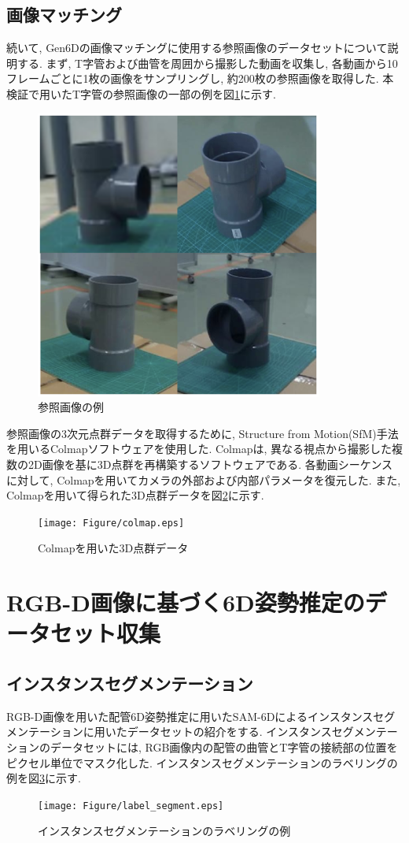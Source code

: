 \subsection{画像マッチング}
続いて, Gen6Dの画像マッチングに使用する参照画像のデータセットについて説明する. 
まず, T字管および曲管を周囲から撮影した動画を収集し, 各動画から10フレームごとに1枚の画像をサンプリングし, 約200枚の参照画像を取得した. 
本検証で用いたT字管の参照画像の一部の例を図\ref{fig:4-f2}に示す. 
\begin{figure}[htbt]
  \centering
   \includegraphics[height=95mm]{Figure/ref_images.eps}
   \caption{参照画像の例}
   \label{fig:4-f2}
\end{figure}

参照画像の3次元点群データを取得するために, Structure from Motion(SfM)手法を用いるColmapソフトウェアを使用した. 
Colmapは, 異なる視点から撮影した複数の2D画像を基に3D点群を再構築するソフトウェアである. 
各動画シーケンスに対して, Colmapを用いてカメラの外部および内部パラメータを復元した. 
また, Colmapを用いて得られた3D点群データを図\ref{fig:4-f3}に示す. 
\begin{figure}[htbt]
  \centering
   \texttt{[image: Figure/colmap.eps]}
   \caption{Colmapを用いた3D点群データ}
   \label{fig:4-f3}
\end{figure}


\section{RGB-D画像に基づく6D姿勢推定のデータセット収集}
\subsection{インスタンスセグメンテーション}
RGB-D画像を用いた配管6D姿勢推定に用いたSAM-6Dによるインスタンスセグメンテーションに用いたデータセットの紹介をする. 
インスタンスセグメンテーションのデータセットには, RGB画像内の配管の曲管とT字管の接続部の位置をピクセル単位でマスク化した. 
インスタンスセグメンテーションのラベリングの例を図\ref{fig:4-f4}に示す. 
\begin{figure}[htbt]
	\centering
	 \texttt{[image: Figure/label\_segment.eps]}
	 \caption{インスタンスセグメンテーションのラベリングの例}
	 \label{fig:4-f4}
\end{figure}

